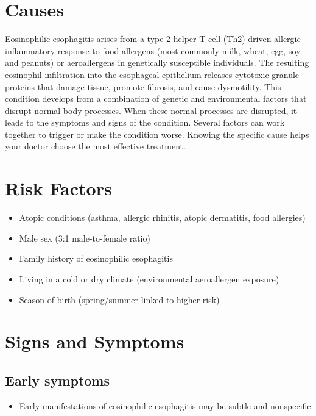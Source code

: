 \section{Causes}
Eosinophilic esophagitis arises from a type 2 helper T-cell (Th2)-driven allergic inflammatory response to food allergens (most commonly milk, wheat, egg, soy, and peanuts) or aeroallergens in genetically susceptible individuals. The resulting eosinophil infiltration into the esophageal epithelium releases cytotoxic granule proteins that damage tissue, promote fibrosis, and cause dysmotility. This condition develops from a combination of genetic and environmental factors that disrupt normal body processes. When these normal processes are disrupted, it leads to the symptoms and signs of the condition. Several factors can work together to trigger or make the condition worse. Knowing the specific cause helps your doctor choose the most effective treatment.

\section{Risk Factors}

\begin{itemize}[noitemsep]
  \item Atopic conditions (asthma, allergic rhinitis, atopic dermatitis, food allergies)
  \item Male sex (3:1 male-to-female ratio)
  \item Family history of eosinophilic esophagitis
  \item Living in a cold or dry climate (environmental aeroallergen exposure)
  \item Season of birth (spring/summer linked to higher risk)
\end{itemize}

\section{Signs and Symptoms}

\subsection{Early symptoms}
\begin{itemize}[noitemsep]
  \item Early manifestations of eosinophilic esophagitis may be subtle and nonspecific
\end{itemize}

